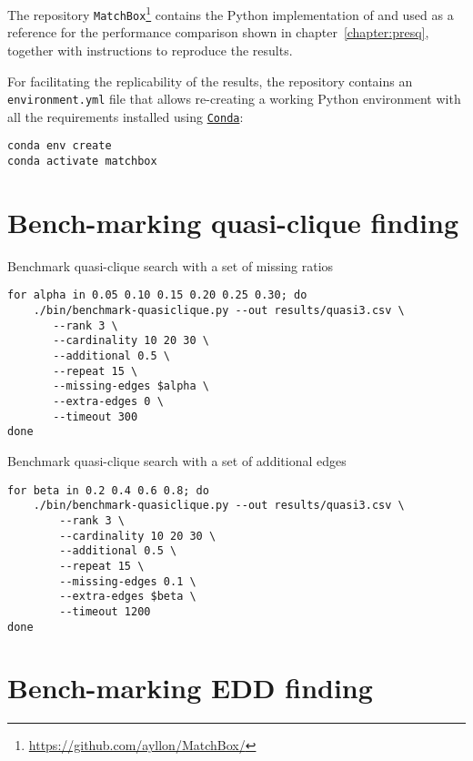 The repository \texttt{MatchBox}\footnote{\url{https://github.com/ayllon/MatchBox/}}
contains the Python implementation of \PresQ and \Find used as a reference for the
performance comparison shown in chapter~\ref{chapter:presq}, together with instructions
to reproduce the results.

For facilitating the replicability of the results, the repository contains an \linebreak
\texttt{environment.yml} file that allows re-creating a working Python environment
with all the requirements installed using \href{https://docs.conda.io/en/latest/}{\texttt{Conda}}:

\begin{verbatim}
conda env create
conda activate matchbox
\end{verbatim}

\section{Bench-marking quasi-clique finding}

\begin{code}
\label{script:quasi_missing}
\caption{Benchmark quasi-clique search with a set of missing ratios}
\begin{verbatim}
for alpha in 0.05 0.10 0.15 0.20 0.25 0.30; do
    ./bin/benchmark-quasiclique.py --out results/quasi3.csv \
       --rank 3 \
       --cardinality 10 20 30 \
       --additional 0.5 \
       --repeat 15 \
       --missing-edges $alpha \
       --extra-edges 0 \
       --timeout 300
done
\end{verbatim}
\end{code}

\begin{code}
\label{script:quasi_spurious}
\caption{Benchmark quasi-clique search with a set of additional edges}
\begin{verbatim}
for beta in 0.2 0.4 0.6 0.8; do
    ./bin/benchmark-quasiclique.py --out results/quasi3.csv \
        --rank 3 \
        --cardinality 10 20 30 \
        --additional 0.5 \
        --repeat 15 \
        --missing-edges 0.1 \
        --extra-edges $beta \
        --timeout 1200
done
\end{verbatim}
\end{code}

\section{Bench-marking EDD finding}

